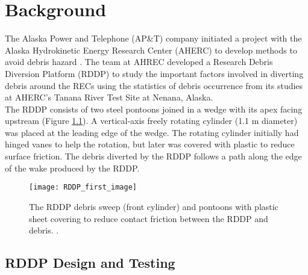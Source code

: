 
\chapter{Background} %

\label{Chapter2} %

The Alaska Power and Telephone (AP\&T) company initiated a project with the Alaska Hydrokinetic Energy Research Center (AHERC) to develop methods to avoid debris hazard \citep{Reference6}. The team at AHREC developed a Research Debris Diversion Platform (RDDP) to study the important factors involved in diverting debris around the RECs using the statistics of debris occurrence from its studies at AHERC's Tanana River Test Site at Nenana, Alaska.\\
The RDDP consists of two steel pontoons joined in a wedge with its apex facing upstream (Figure \ref{fig:RDDP_first_image}). A vertical-axis freely rotating cylinder (1.1 m diameter) was placed at the leading edge of the wedge. The rotating cylinder initially had hinged vanes to help the rotation, but later was covered with plastic to reduce surface friction. The debris diverted by the RDDP follows a path along the edge of the wake produced by the RDDP.\\
\begin{figure}[H]
\centering
\texttt{[image: RDDP\_first\_image]}
\caption{\label{fig:RDDP_first_image}The RDDP debris sweep (front cylinder) and pontoons with plastic sheet covering to reduce contact friction between the RDDP and debris. \citep{Reference6}.}
\end{figure}
\section{RDDP Design and Testing}
